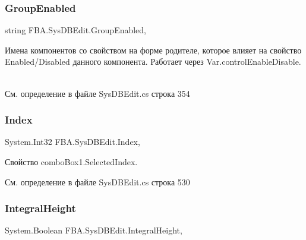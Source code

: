 \subsubsection{\texorpdfstring{Group\+Enabled}{GroupEnabled}}
{\footnotesize\ttfamily string F\+B\+A.\+Sys\+D\+B\+Edit.\+Group\+Enabled\hspace{0.3cm}{\ttfamily [get]}, {\ttfamily [set]}}



Имена компонентов со свойством на форме родителе, которое влияет на свойство Enabled/\+Disabled данного компонента. Работает через Var.\+control\+Enable\+Disable. ~\newline




См. определение в файле Sys\+D\+B\+Edit.\+cs строка 354

\mbox{\label{class_f_b_a_1_1_sys_d_b_edit_aef8f3fa71385908a050aba50d6ccdf5e}} 
\subsubsection{\texorpdfstring{Index}{Index}}
{\footnotesize\ttfamily System.\+Int32 F\+B\+A.\+Sys\+D\+B\+Edit.\+Index\hspace{0.3cm}{\ttfamily [get]}, {\ttfamily [set]}}



Свойство combo\+Box1.\+Selected\+Index. 



См. определение в файле Sys\+D\+B\+Edit.\+cs строка 530

\mbox{\label{class_f_b_a_1_1_sys_d_b_edit_acd81e2f3e6d047df18d76f2aa1792b4e}} 
\subsubsection{\texorpdfstring{Integral\+Height}{IntegralHeight}}
{\footnotesize\ttfamily System.\+Boolean F\+B\+A.\+Sys\+D\+B\+Edit.\+Integral\+Height\hspace{0.3cm}{\ttfamily [get]}, {\ttfamily [set]}}



